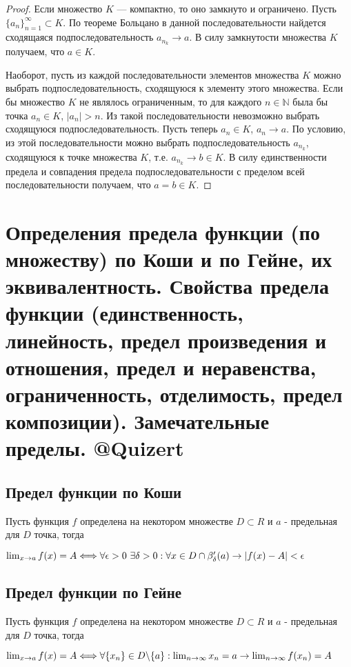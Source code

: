 \documentclass[12pt]{article}
\theoremstyle{definition}
\begin{document}
\begin{proof}
Если множество $K$ --- компактно, то оно замкнуто и ограничено.
Пусть $\{a_n\}_{n=1}^\infty\subset K$. По теореме Больцано в данной последовательности
найдется сходящаяся подпоследовательность $a_{n_k}\to a$. В силу замкнутости множества $K$
получаем, что $a\in K$.

Наоборот, пусть из каждой последовательности элементов множества $K$
можно выбрать подпоследовательность, сходящуюся к элементу этого множества.
Если бы множество $K$ не являлось ограниченным, то для каждого $n\in \mathbb{N}$
была бы точка $a_n\in K$, $|a_n|>n$. Из такой последовательности невозможно выбрать
сходящуюся подпоследовательность. Пусть теперь $a_n\in K$, $a_n\to a$.
По условию, из этой последовательности можно выбрать подпоследовательность $a_{n_k}$,
сходящуюся к точке множества $K$, т.е. $a_{n_k}\to b\in K$. В силу единственности предела
и совпадения предела подпоследовательности с пределом всей последовательности получаем,
что $a=b\in K$.
\end{proof}

\section{Определения предела функции (по множеству) по Коши и по Гейне, их эквивалентность. Свойства предела функции (единственность, линейность, предел произведения и отношения, предел и неравенства, ограниченность, отделимость, предел композиции). Замечательные пределы. @Quizert}
\subsection{Предел функции по Коши}
Пусть функция $f$ определена на некотором множестве $D \subset R$ и $a $ - предельная для $D$ точка, тогда
\begin{center}
$\lim_{x \to a} f(x) = A \Longleftrightarrow \\ \forall \epsilon > 0 \ \exists \delta > 0: \forall x \in D \cap \beta'_{\delta}(a) \to |f(x) - A | < \epsilon$
\end{center}
\subsection{Предел функции по Гейне}
Пусть функция $f$ определена на некотором множестве $D \subset R$ и $a $ - предельная для $D$ точка, тогда
\begin{center}
$\lim_{x \to a} f(x) = A \Longleftrightarrow \\ \forall \{x_n\} \in D \backslash \{a\} :\lim_{n \to \infty}x_n = a \to \lim_{n\to \infty} f(x_n) = A$
\end{center}
\end{document}
